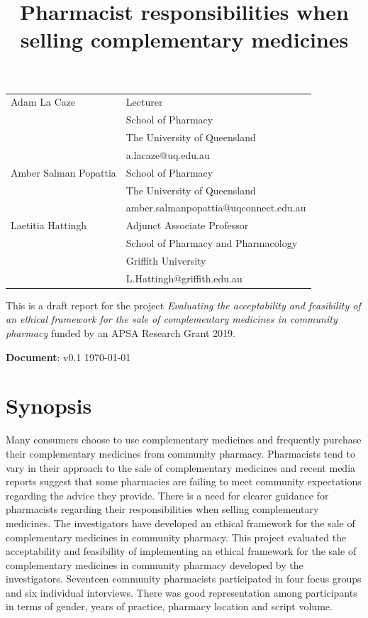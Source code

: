 \documentclass[11pt,a4paper]{article}
\title{Pharmacist responsibilities when selling complementary medicines}
\author{}
\date{}
\newcommand{\vers}{v0.1 \hfill \today}
\begin{document}
\maketitle

\begin{tabular}{ll} Adam La Caze & Lecturer\tabularnewline
& School of Pharmacy\tabularnewline
& The University of Queensland\tabularnewline
& a.lacaze@uq.edu.au\tabularnewline[10pt] Amber Salman Popattia & School of Pharmacy\tabularnewline
& The University of Queensland\tabularnewline
& amber.salmanpopattia@uqconnect.edu.au\tabularnewline[10pt] Laetitia Hattingh & Adjunct Associate Professor\tabularnewline
& School of Pharmacy and Pharmacology\tabularnewline
& Griffith University\tabularnewline
& L.Hattingh@griffith.edu.au\tabularnewline
\end{tabular}

\vfill
This is a draft report for the project \emph{Evaluating the
acceptability and feasibility of an ethical framework for the sale of
complementary medicines in community pharmacy} funded by an APSA
Research Grant 2019.

\bigskip
\textbf{Document}: \vers
\newpage 

\tableofcontents

\newpage

\section{Synopsis}\label{synopsis}

Many consumers choose to use complementary medicines and frequently
purchase their complementary medicines from community pharmacy.
Pharmacists tend to vary in their approach to the sale of complementary
medicines and recent media reports suggest that some pharmacies are
failing to meet community expectations regarding the advice they
provide. There is a need for clearer guidance for pharmacists regarding
their responsibilities when selling complementary medicines. The
investigators have developed an ethical framework for the sale of
complementary medicines in community pharmacy. This project evaluated
the acceptability and feasibility of implementing an ethical framework
for the sale of complementary medicines in community pharmacy developed
by the investigators. Seventeen community pharmacists participated in
four focus groups and six individual interviews. There was good
representation among participants in terms of gender, years of practice,
pharmacy location and script volume.
\end{document}
